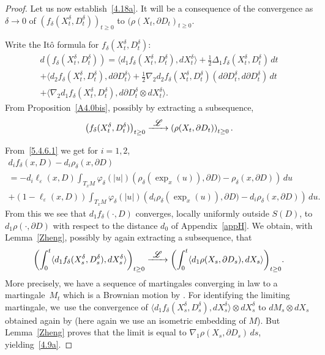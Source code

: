 \documentclass[JEP,XML,SOM,Unicode,NoFloatCountersInSection,published]{cedram}
\newcommand\To[1]{\mathchoice{\xrightarrow{\textstyle\kern4pt#1\kern3pt}}{\stackrel{#1}{\longrightarrow}}{}{}}
\theoremstyle{plain}
\theoremstyle{definition}
\newcommand{\SL}{{\mathscr L}}
\let\f\frac
\let\d\delta
\let\e\varepsilon
\let\n\nabla
\begin{document}
\begin{proof}
Let us now establish~\eqref{4.18a}. It will be a consequence of the convergence as $\d\to 0$ of $(f_\d(X_t^\d, D_t^\d))_{t\ge 0}$ to $(\rho(X_t,\partial D_t)_{t\ge 0}$.

Write the Itô formula for $f_\d(X_t^\d, D_t^\d)$:
\begin{multline}
\label{4.14bis}
d\left(f_\d(X_t^\d, D_t^\d)\right)=\langle d_1f_\d(X_t^\d, D_t^\d), dX_t^\d\rangle +\f12\Delta_1f_\d(X_t^\d, D_t^\d)\,dt\\
+\langle d_2f_\d(X_t^\d, D_t^\d), d\partial D_t^\d\rangle +\f12\n_2d_2f_\d(X_t^\d, D_t^\d)(d\partial D_t^\d,d\partial D_t^\d)\,dt\\
+\langle \n_2 d_1f_\d(X_t^\d, D_t^\d), d\partial D_t^\d \otimes dX_t^\d\rangle.
\end{multline}
From Proposition~\ref{A4.0bis}, possibly by extracting a subsequence,
\begin{equation}
\label{4.8}
\left(f_\d(X_t^\d, D_t^\d)\right)_{t\ge 0}\To{\SL}\left(\rho(X_t, \partial D_t)\right)_{t\ge 0}.
\end{equation}

From~\eqref{5.4.6.1} we get for $i=1,2$,
\begin{multline}
d_if_\d(x,D)-d_i\rho_\d(x,\partial D)\\
=-d_i\ell_\e(x,D)\int_{T_xM}\varphi_\d(\vert u\vert )\left(\rho_\d(\exp_x(u)),\partial D)-\rho_\d(x,\partial D)\right)\, du\\
+(1-\ell_\e(x,D))\int_{T_xM}\varphi_\d(\vert u\vert )\left(d_i\rho_\d(\exp_x(u)),\partial D)-d_i\rho_\d(x,\partial D)\right)\, du.
\end{multline}
From this we see that $d_1f_\d(\cdot, D)$ converges, locally uniformly outside $S(D)$, to $d_1\rho(\cdot, \partial D)$ with respect to the distance $d_0$ of Appendix~\ref{appH}. We obtain, with Lemma~\ref{Zheng}, possibly by again extracting a subsequence, that
\begin{equation}
\label{4.9a}
\biggl(\int_0^t\langle d_1f_\d(X_s^\d, D_s^\d), dX_s^\d\rangle\biggr)_{t\ge 0}\To{\SL}\biggl(\int_0^t\langle d_1\rho (X_s,\partial D_s), dX_s\rangle\biggr)_{t\ge 0}.
\end{equation}
More precisely, we have a sequence of martingales converging in law to a martingale~$M_t$ which is a Brownian motion by \cite[Th.\,3]{Zheng:85}. For identifying the limiting martingale, we~use the convergence of $\langle d_1f_\d(X_s^\d, D_s^\d), dX_s^\d\rangle\otimes dX_s^\d$ to $ dM_s\otimes dX_s$ obtained again by \cite[Th.\,3]{Zheng:85} (here again we use an isometric embedding of $M$). But Lemma~\ref{Zheng} proves that the limit is equal to $\n_1\rho (X_s,\partial D_s)\, ds$, yielding~\eqref{4.9a}.


\end{proof}
\end{document}
